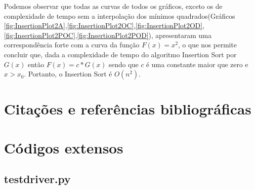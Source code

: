 \documentclass[12pt,a4paper,twoside]{report}
\begin{document}
Podemos observar que todas as curvas de todos os gráficos, exceto os de complexidade de tempo sem a interpolação dos mínimos quadrados(Gráficos \ref{fig:InsertionPlot2A},\ref{fig:InsertionPlot2OC},\ref{fig:InsertionPlot2OD},\ref{fig:InsertionPlot2POC},\ref{fig:InsertionPlot2POD}), apresentaram uma correspondência forte com a curva da função $F(x) = x^2$, o que nos permite concluir que, dada a complexidade de tempo do algoritmo Insertion Sort por $G(x)$ então $F(x) = c * G(x)$ sendo que $c$ é uma constante maior que zero e $x > x_0$. Portanto, o Insertion Sort é $O(n^2)$.

\chapter{Citações e referências bibliográficas}








\clearpage
{}
\appendix

\chapter{Códigos extensos \label{ap:testdriver}}
\section{testdriver.py}

\end{document}
